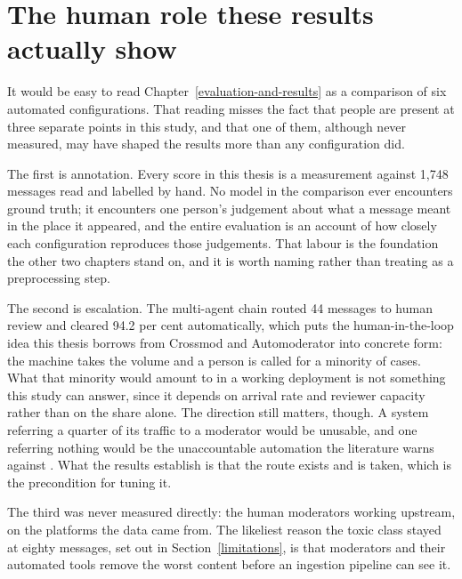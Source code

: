 \section{The human role these results actually show}\label{the-human-role}

It would be easy to read Chapter~\ref{evaluation-and-results} as a comparison of six automated configurations. That reading misses the fact that people are present at three separate points in this study, and that one of them, although never measured, may have shaped the results more than any configuration did.

The first is annotation. Every score in this thesis is a measurement against 1,748 messages read and labelled by hand. No model in the comparison ever encounters ground truth; it encounters one person's judgement about what a message meant in the place it appeared, and the entire evaluation is an account of how closely each configuration reproduces those judgements. That labour is the foundation the other two chapters stand on, and it is worth naming rather than treating as a preprocessing step.

The second is escalation. The multi-agent chain routed 44 messages to human review and cleared 94.2 per cent automatically, which puts the human-in-the-loop idea this thesis borrows from Crossmod and Automoderator \citep{chandrasekharan2019crossmod, jhaver2019automod} into concrete form: the machine takes the volume and a person is called for a minority of cases. What that minority would amount to in a working deployment is not something this study can answer, since it depends on arrival rate and reviewer capacity rather than on the share alone. The direction still matters, though. A system referring a quarter of its traffic to a moderator would be unusable, and one referring nothing would be the unaccountable automation the literature warns against \citep{gillespie2018custodians}. What the results establish is that the route exists and is taken, which is the precondition for tuning it.

The third was never measured directly: the human moderators working upstream, on the platforms the data came from. The likeliest reason the toxic class stayed at eighty messages, set out in Section~\ref{limitations}, is that moderators and their automated tools remove the worst content before an ingestion pipeline can see it.

